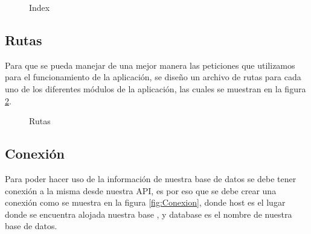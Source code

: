  \begin{figure}[htbp!]
 	\centering
 	\caption{Index}
 	\label{fig:Index}
 \end{figure}
 \subsection{Rutas}
 
 Para que se pueda manejar de una mejor manera las peticiones que utilizamos para el funcionamiento de la aplicación, se diseño un archivo de rutas para cada uno de los diferentes módulos de la aplicación, las cuales se muestran en la figura \ref{fig:Rutas}.

\begin{figure}[htbp!]
	\centering
	\caption{Rutas}
	\label{fig:Rutas}
\end{figure}

 \subsection{Conexión}
 
 Para poder hacer uso de la información de nuestra base de datos se debe tener conexión a la misma desde nuestra API, es por eso que se debe crear una conexión como se muestra en la figura \ref{fig:Conexion}, donde host es el lugar donde se encuentra alojada nuestra base , y database es el nombre de nuestra base de datos.
 
